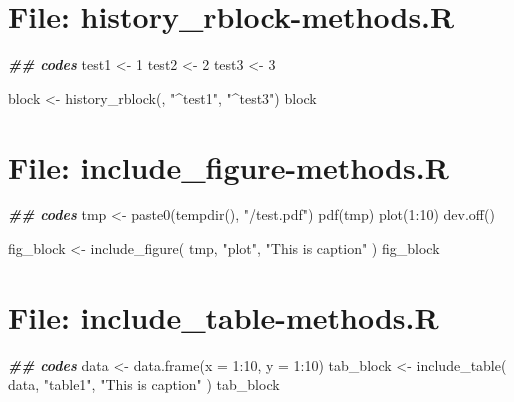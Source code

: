 \documentclass[
]{article}
\newenvironment{Shaded}{\begin{snugshade}}{\end{snugshade}}
\newcommand{\AttributeTok}[1]{\textcolor[rgb]{0.77,0.63,0.00}{#1}}
\newcommand{\DecValTok}[1]{\textcolor[rgb]{0.00,0.00,0.81}{#1}}
\newcommand{\DocumentationTok}[1]{\textcolor[rgb]{0.56,0.35,0.01}{\textbf{\textit{#1}}}}
\newcommand{\FunctionTok}[1]{\textcolor[rgb]{0.00,0.00,0.00}{#1}}
\newcommand{\NormalTok}[1]{#1}
\newcommand{\OtherTok}[1]{\textcolor[rgb]{0.56,0.35,0.01}{#1}}
\newcommand{\SpecialCharTok}[1]{\textcolor[rgb]{0.00,0.00,0.00}{#1}}
\newcommand{\StringTok}[1]{\textcolor[rgb]{0.31,0.60,0.02}{#1}}
\begin{document}
\hypertarget{file-history_rblock-methods.r}{%
\section{File: history\_rblock-methods.R}\label{file-history_rblock-methods.r}}

\begin{Shaded}
\begin{Highlighting}[]
\DocumentationTok{\#\# codes}
\NormalTok{test1 }\OtherTok{\textless{}{-}} \DecValTok{1}
\NormalTok{test2 }\OtherTok{\textless{}{-}} \DecValTok{2}
\NormalTok{test3 }\OtherTok{\textless{}{-}} \DecValTok{3}

\NormalTok{block }\OtherTok{\textless{}{-}} \FunctionTok{history\_rblock}\NormalTok{(, }\StringTok{"\^{}test1"}\NormalTok{, }\StringTok{"\^{}test3"}\NormalTok{)}
\NormalTok{block}
\end{Highlighting}
\end{Shaded}

\hypertarget{file-include_figure-methods.r}{%
\section{File: include\_figure-methods.R}\label{file-include_figure-methods.r}}

\begin{Shaded}
\begin{Highlighting}[]
\DocumentationTok{\#\# codes}
\NormalTok{tmp }\OtherTok{\textless{}{-}} \FunctionTok{paste0}\NormalTok{(}\FunctionTok{tempdir}\NormalTok{(), }\StringTok{"/test.pdf"}\NormalTok{)}
\FunctionTok{pdf}\NormalTok{(tmp)}
\FunctionTok{plot}\NormalTok{(}\DecValTok{1}\SpecialCharTok{:}\DecValTok{10}\NormalTok{)}
\FunctionTok{dev.off}\NormalTok{()}

\NormalTok{fig\_block }\OtherTok{\textless{}{-}} \FunctionTok{include\_figure}\NormalTok{(}
\NormalTok{  tmp, }\StringTok{"plot"}\NormalTok{, }\StringTok{"This is caption"}
\NormalTok{)}
\NormalTok{fig\_block}
\end{Highlighting}
\end{Shaded}

\hypertarget{file-include_table-methods.r}{%
\section{File: include\_table-methods.R}\label{file-include_table-methods.r}}

\begin{Shaded}
\begin{Highlighting}[]
\DocumentationTok{\#\# codes}
\NormalTok{data }\OtherTok{\textless{}{-}} \FunctionTok{data.frame}\NormalTok{(}\AttributeTok{x =} \DecValTok{1}\SpecialCharTok{:}\DecValTok{10}\NormalTok{, }\AttributeTok{y =} \DecValTok{1}\SpecialCharTok{:}\DecValTok{10}\NormalTok{)}
\NormalTok{tab\_block }\OtherTok{\textless{}{-}} \FunctionTok{include\_table}\NormalTok{(}
\NormalTok{  data, }\StringTok{"table1"}\NormalTok{,}
  \StringTok{"This is caption"}
\NormalTok{)}
\NormalTok{tab\_block}
\end{Highlighting}
\end{Shaded}
\end{document}
